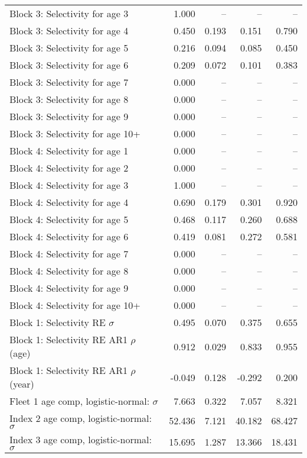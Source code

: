 \documentclass[
]{article}
\begin{document}
\begin{landscape}
\begin{longtable}[t]{lrrrr}
\addlinespace
Block 3: Selectivity for age 3 & 1.000 & -- & -- & --\\
Block 3: Selectivity for age 4 & 0.450 & 0.193 & 0.151 & 0.790\\
Block 3: Selectivity for age 5 & 0.216 & 0.094 & 0.085 & 0.450\\
Block 3: Selectivity for age 6 & 0.209 & 0.072 & 0.101 & 0.383\\
Block 3: Selectivity for age 7 & 0.000 & -- & -- & --\\
\addlinespace
Block 3: Selectivity for age 8 & 0.000 & -- & -- & --\\
Block 3: Selectivity for age 9 & 0.000 & -- & -- & --\\
Block 3: Selectivity for age 10+ & 0.000 & -- & -- & --\\
Block 4: Selectivity for age 1 & 0.000 & -- & -- & --\\
Block 4: Selectivity for age 2 & 0.000 & -- & -- & --\\
\addlinespace
Block 4: Selectivity for age 3 & 1.000 & -- & -- & --\\
Block 4: Selectivity for age 4 & 0.690 & 0.179 & 0.301 & 0.920\\
Block 4: Selectivity for age 5 & 0.468 & 0.117 & 0.260 & 0.688\\
Block 4: Selectivity for age 6 & 0.419 & 0.081 & 0.272 & 0.581\\
Block 4: Selectivity for age 7 & 0.000 & -- & -- & --\\
\addlinespace
Block 4: Selectivity for age 8 & 0.000 & -- & -- & --\\
Block 4: Selectivity for age 9 & 0.000 & -- & -- & --\\
Block 4: Selectivity for age 10+ & 0.000 & -- & -- & --\\
Block 1: Selectivity RE $\sigma$ & 0.495 & 0.070 & 0.375 & 0.655\\
Block 1: Selectivity RE AR1 $\rho$ (age) & 0.912 & 0.029 & 0.833 & 0.955\\
\addlinespace
Block 1: Selectivity RE AR1 $\rho$ (year) & -0.049 & 0.128 & -0.292 & 0.200\\
Fleet 1 age comp, logistic-normal: $\sigma$ & 7.663 & 0.322 & 7.057 & 8.321\\
Index 2 age comp, logistic-normal: $\sigma$ & 52.436 & 7.121 & 40.182 & 68.427\\
Index 3 age comp, logistic-normal: $\sigma$ & 15.695 & 1.287 & 13.366 & 18.431\\*
\end{longtable}
\end{landscape}
\end{document}
